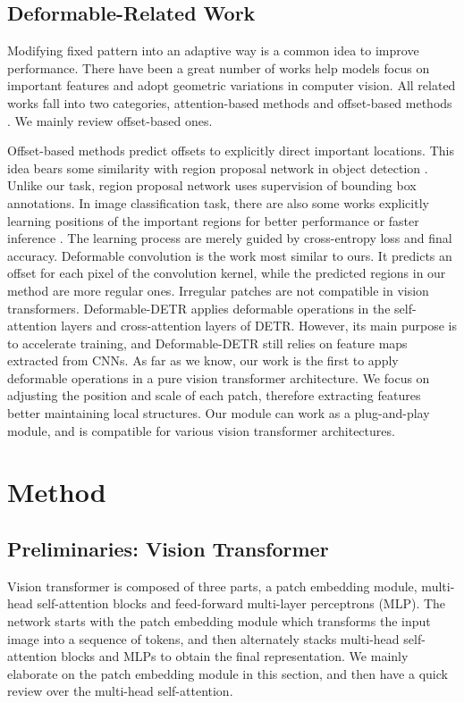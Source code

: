 \documentclass[sigconf,screen]{acmart}
\begin{document}
\subsection{Deformable-Related Work}
 Modifying fixed pattern into an adaptive way is a common idea to
 improve performance. There have been a great number of works
 help models focus on important features and adopt geometric variations in computer vision. All related works fall into two categories, attention-based methods
 \cite{senet,nonlocal,gcnet,ccnet} and offset-based methods \cite{dcn,dcnv2,deformabledetr,gfnet,racnn}. We mainly review offset-based ones.
 
 Offset-based methods predict offsets to explicitly direct important
 locations. This idea bears some similarity with region proposal
 network in object detection \cite{fasterrcnn,maskrcnn}. Unlike our task, region
 proposal network uses supervision of bounding box annotations.
 In image classification task, there are also some works explicitly learning positions
 of the important regions for better performance \cite{racnn} or faster inference \cite{gfnet}.
 The learning process are merely guided by cross-entropy loss and final accuracy. 
 Deformable convolution \cite{dcn,dcnv2} is the work most similar to ours. It predicts an offset for each pixel of the convolution kernel, while the predicted regions in our method are more regular ones. Irregular patches are not compatible in vision transformers. Deformable-DETR \cite{deformabledetr} applies deformable operations in the self-attention layers and cross-attention layers of DETR. However, its main purpose is to accelerate training, and Deformable-DETR still relies on feature maps extracted from CNNs. As far as we know, our work is the first to apply deformable operations in a pure vision transformer architecture. We focus on adjusting the position and scale of each patch, therefore extracting features better maintaining local structures. Our module can work as a plug-and-play module, and is compatible for various vision transformer architectures.

\section{Method}
\subsection{Preliminaries: Vision Transformer\label{sec:preliminary}}
Vision transformer is composed of three parts, a patch embedding module, multi-head self-attention blocks and feed-forward multi-layer perceptrons (MLP). The network starts with the patch embedding module which transforms the input image into a sequence of tokens, and then alternately stacks multi-head self-attention blocks and MLPs to obtain the final representation. We mainly elaborate on the patch embedding module in this section, and then have a quick review over the multi-head self-attention.
\end{document}
